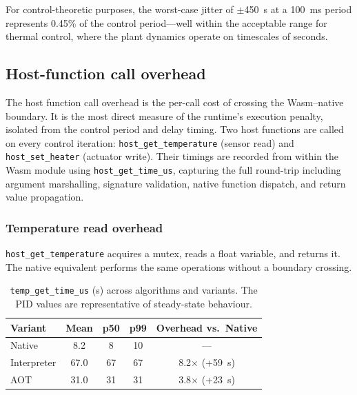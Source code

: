 \documentclass[12pt, a4paper]{report}
\begin{document}
For control-theoretic purposes, the worst-case jitter of $\pm$450~\textmu{}s at a 100~ms period represents 0.45\% of the control period---well within the acceptable range for thermal control, where the plant dynamics operate on timescales of seconds.

\subsection{Host-function call overhead}
\label{sec:host-overhead}

The host function call overhead is the per-call cost of crossing the Wasm--native boundary. It is the most direct measure of the runtime's execution penalty, isolated from the control period and delay timing. Two host functions are called on every control iteration: \texttt{host\_get\_temperature} (sensor read) and \texttt{host\_set\_heater} (actuator write). Their timings are recorded from within the Wasm module using \texttt{host\_get\_time\_us}, capturing the full round-trip including argument marshalling, signature validation, native function dispatch, and return value propagation.

\subsubsection{Temperature read overhead}
\label{subsec:temp-get-overhead}

\texttt{host\_get\_temperature} acquires a mutex, reads a float variable, and returns it. The native equivalent performs the same operations without a boundary crossing.

\begin{table}[htbp]
\centering
\label{tab:temp-get}
\small
\begin{tabular}{@{}lcccc@{}}
    \toprule
    \textbf{Variant} & \textbf{Mean} & \textbf{p50} & \textbf{p99} & \textbf{Overhead vs.\ Native} \\
    \midrule
    Native       & 8.2  & 8  & 10 & --- \\
    Interpreter  & 67.0 & 67 & 67 & 8.2$\times$ (+59~\textmu{}s) \\
    AOT          & 31.0 & 31 & 31 & 3.8$\times$ (+23~\textmu{}s) \\
    \bottomrule
\end{tabular}
\caption{\texttt{temp\_get\_time\_us} (\textmu{}s) across algorithms and variants. The PID values are representative of steady-state behaviour.}
\end{table}
\end{document}

